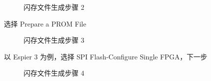 \documentclass[hyperref,UTF8,12pt,a4paper]{ctexart}
\begin{document}
\begin{figure}[H]
\centering
{}
\caption{闪存文件生成步骤 2}
\end{figure}

选择 Prepare a PROM File

\begin{figure}[H]
\centering
{}
\caption{闪存文件生成步骤 3}
\end{figure}

以 Espier 3 为例，选择 SPI Flash-Configure Single FPGA，下一步

\begin{figure}[H]
\centering
{}
\caption{闪存文件生成步骤 4}
\end{figure}
\end{document}
